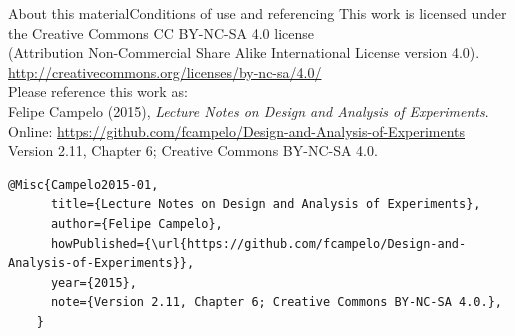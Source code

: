 \documentclass[t]{beamer}
\begin{document}
\begin{ftstf}{About this material}{Conditions of use and referencing}
\centering\footnotesize This work is licensed under the Creative Commons CC BY-NC-SA 4.0 license\\(Attribution Non-Commercial Share Alike International License version 4.0).\\
\vhalf
\url{http://creativecommons.org/licenses/by-nc-sa/4.0/}\\
\vone
\footnotesize Please reference this work as:\\
\footnotesize \flushleft Felipe Campelo (2015), \textit{Lecture Notes on Design and Analysis of Experiments}.\\Online: {\scriptsize\url{https://github.com/fcampelo/Design-and-Analysis-of-Experiments}}\\
Version 2.11, Chapter 6; Creative Commons BY-NC-SA 4.0.\\

\begin{Verbatim}[fontsize=\tiny]
    @Misc{Campelo2015-01,
      title={Lecture Notes on Design and Analysis of Experiments},
      author={Felipe Campelo},
      howPublished={\url{https://github.com/fcampelo/Design-and-Analysis-of-Experiments}},
      year={2015},
      note={Version 2.11, Chapter 6; Creative Commons BY-NC-SA 4.0.},
    }
\end{Verbatim}

\end{ftstf}
\end{document}

